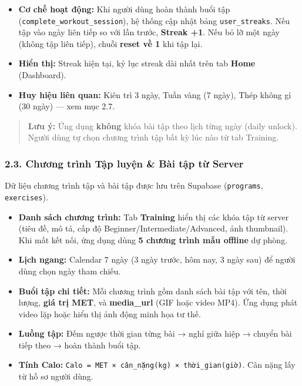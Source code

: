 \documentclass[12pt,a4paper]{article}
\providecommand{\tightlist}{%
  \setlength{\itemsep}{0pt}\setlength{\parskip}{0pt}}
\begin{document}
\begin{itemize}
\tightlist
\item
  \textbf{Cơ chế hoạt động:} Khi người dùng hoàn thành buổi tập
  (\texttt{complete\_workout\_session}), hệ thống cập nhật bảng
  \texttt{user\_streaks}. Nếu tập vào ngày liên tiếp so với lần trước,
  \textbf{Streak +1}. Nếu bỏ lỡ một ngày (không tập liên tiếp), chuỗi
  \textbf{reset về 1} khi tập lại.
\item
  \textbf{Hiển thị:} Streak hiện tại, kỷ lục streak dài nhất trên tab
  \textbf{Home} (Dashboard).
\item
  \textbf{Huy hiệu liên quan:} Kiên trì 3 ngày, Tuần vàng (7 ngày), Thép
  không gỉ (30 ngày) --- xem mục 2.7.
\end{itemize}

\begin{quote}
\textbf{Lưu ý:} Ứng dụng \textbf{không} khóa bài tập theo lịch từng ngày
(daily unlock). Người dùng tự chọn chương trình tập bất kỳ lúc nào từ
tab Training.
\end{quote}

\subsubsection{2.3. Chương trình Tập luyện \& Bài tập từ
Server}\label{chux1b0ux1a1ng-truxecnh-tux1eadp-luyux1ec7n-buxe0i-tux1eadp-tux1eeb-server}

Dữ liệu chương trình tập và bài tập được lưu trên Supabase
(\texttt{programs}, \texttt{exercises}).

\begin{itemize}
\tightlist
\item
  \textbf{Danh sách chương trình:} Tab \textbf{Training} hiển thị các
  khóa tập từ server (tiêu đề, mô tả, cấp độ
  Beginner/Intermediate/Advanced, ảnh thumbnail). Khi mất kết nối, ứng
  dụng dùng \textbf{5 chương trình mẫu offline} dự phòng.
\item
  \textbf{Lịch ngang:} Calendar 7 ngày (3 ngày trước, hôm nay, 3 ngày
  sau) để người dùng chọn ngày tham chiếu.
\item
  \textbf{Buổi tập chi tiết:} Mỗi chương trình gồm danh sách bài tập với
  tên, thời lượng, \textbf{giá trị MET}, và \textbf{media\_url} (GIF
  hoặc video MP4). Ứng dụng phát video lặp hoặc hiển thị ảnh động minh
  họa tư thế.
\item
  \textbf{Luồng tập:} Đếm ngược thời gian từng bài → nghỉ giữa hiệp →
  chuyển bài tiếp theo → hoàn thành buổi tập.
\item
  \textbf{Tính Calo:}
  \texttt{Calo\ =\ MET\ ×\ cân\_nặng(kg)\ ×\ thời\_gian(giờ)}. Cân nặng
  lấy từ hồ sơ người dùng.
\end{itemize}
\end{document}
